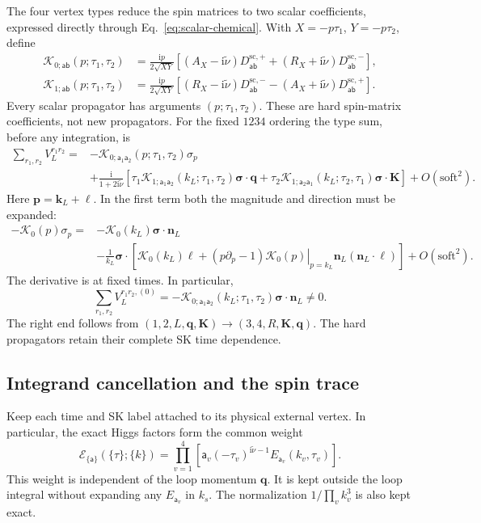 \documentclass[a4paper,12pt]{article}
\newcommand{\ii}{\mathrm i}
\newcommand{\mb}{\mathbf}
\newcommand{\tn}{\tilde\nu}
\def\aa{\mathsf a}
\newcommand{\bb}{\mathsf b}
\newcommand{\bq}{\mb q}
\newcommand{\bs}{\bm\sigma}
\newcommand{\Dsc}[1]{D^{\mathrm{sc},#1}}
\begin{document}
The four vertex types reduce the spin matrices to two scalar
coefficients, expressed directly through Eq.~\eqref{eq:scalar-chemical}.
With $X=-p\tau_1$, $Y=-p\tau_2$, define
\begin{align}
 \mathcal K_{0;\aa\bb}(p;\tau_1,\tau_2)
 &=\frac{\ii p}{2\sqrt{XY}}\left[
 (A_X-\ii\tn)\Dsc{+}_{\aa\bb}
 +(R_X+\ii\tn)\Dsc{-}_{\aa\bb}\right],\nonumber\\
 \mathcal K_{1;\aa\bb}(p;\tau_1,\tau_2)
 &=\frac{\ii p}{2\sqrt{XY}}\left[
 (R_X-\ii\tn)\Dsc{-}_{\aa\bb}
 -(A_X+\ii\tn)\Dsc{+}_{\aa\bb}\right].
 \label{eq:hard-scalar-coefficients}
\end{align}
Every scalar propagator has arguments $(p;\tau_1,\tau_2)$.
These are hard spin-matrix coefficients, not new propagators.
For the fixed $1234$ ordering the type sum, before any integration, is
\begin{align}
 \sum_{r_1,r_2}V_L^{r_1r_2}
 ={}&-\mathcal K_{0;\aa_1\aa_2}(p;\tau_1,\tau_2)\sigma_p
 \nonumber\\
 &+\frac{\ii}{1+2\ii\tn}
 \left[\tau_1\mathcal K_{1;\aa_1\aa_2}(k_L;\tau_1,\tau_2)\bs\cdot\bq
 +\tau_2\mathcal K_{1;\aa_2\aa_1}(k_L;\tau_2,\tau_1)\bs\cdot\mb K\right]
 +O(\text{soft}^2).
 \label{eq:vertex-expand}
\end{align}
Here $\mb p=\mb k_L+\bm\ell$. In the first term both the magnitude
and direction must be expanded:
\begin{align}
 -\mathcal K_0(p)\sigma_p
 ={}&-\mathcal K_0(k_L)\bs\cdot\mb n_L\nonumber\\
 &-\frac1{k_L}\bs\cdot
 \left[\mathcal K_0(k_L)\bm\ell+
 \left.(p\partial_p-1)\mathcal K_0(p)\right|_{p=k_L}
 \mb n_L(\mb n_L\cdot\bm\ell)\right]
 +O(\text{soft}^2).
 \label{eq:hard-taylor}
\end{align}
The derivative is at fixed times. In particular,
\begin{equation}
 \sum_{r_1,r_2}V_L^{r_1r_2,(0)}
 =-\mathcal K_{0;\aa_1\aa_2}(k_L;\tau_1,\tau_2)\bs\cdot\mb n_L
 \ne0.
 \label{eq:hard-zeroth-weyl}
\end{equation}
The right end follows from $(1,2,L,\bq,\mb K)\to(3,4,R,\mb K,\bq)$.
The hard propagators retain their complete SK time dependence.

\subsection{Integrand cancellation and the spin trace}
\label{sec:integrand-cancel}
Keep each time and SK label attached to its physical external vertex.
In particular, the exact Higgs factors form the common weight
\begin{equation}
 \mathcal E_{\{\aa\}}(\{\tau\};\{k\})
 =\prod_{v=1}^4
 [\aa_v(-\tau_v)^{\ii\tn-1}E_{\aa_v}(k_v,\tau_v)].
 \label{eq:exact-external-weight}
\end{equation}
This weight is independent of the loop momentum $\bq$. It is kept
outside the loop integral without expanding any $E_{\aa_v}$ in $k_s$.
The normalization $1/\prod_v k_v^3$ is also kept exact.
\end{document}
